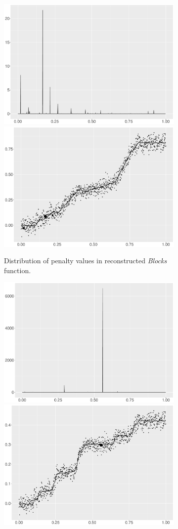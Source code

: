 \begin{figure}
    \centering
    \begin{subfigure}{\textwidth}
    \centering
    \includegraphics[width=0.45\linewidth]{Chapters/02TractorSplineTheory/plot/ggplot/ggBlocksPenaltyBar.pdf}
    \includegraphics[width=0.45\linewidth]{Chapters/02TractorSplineTheory/plot/ggplot/ggBlocksPenaltyLine.pdf}
    \caption{Distribution of penalty values in reconstructed \textit{Blocks} function.}
    \end{subfigure}
    \begin{subfigure}{\textwidth}
    \centering
    \includegraphics[width=0.45\linewidth]{Chapters/02TractorSplineTheory/plot/ggplot/ggBumpsPenaltyBar.pdf}
    \includegraphics[width=0.45\linewidth]{Chapters/02TractorSplineTheory/plot/ggplot/ggBumpsPenaltyLine.pdf}

\end{subfigure}
\end{figure}
